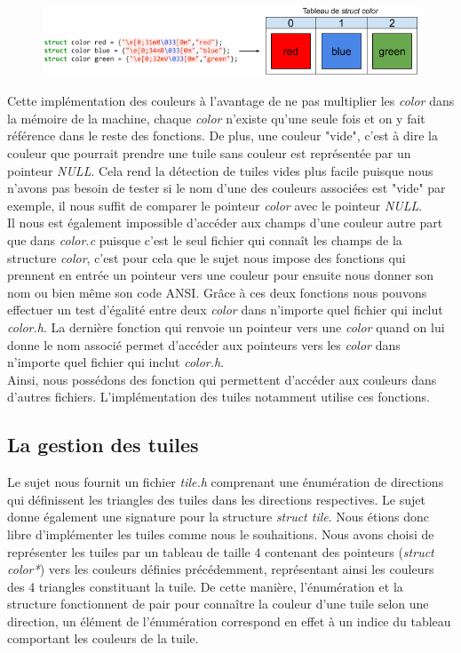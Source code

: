 \documentclass[11pt]{article}
\begin{document}
\begin{figure}[H]
\centering
\includegraphics[scale=0.7]{Couleurs.png}
\label{fig : color}
\end{figure}

Cette implémentation des couleurs à l'avantage de ne pas multiplier les \emph{color} dans la mémoire de la machine, chaque \emph{color} n'existe qu'une seule fois et on y fait référence dans le reste des fonctions. De plus, une couleur "vide", c'est à dire la couleur que pourrait prendre une tuile sans couleur est représentée par un pointeur \emph{NULL}. Cela rend la détection de tuiles vides plus facile puisque nous n'avons pas besoin de tester si le nom d'une des couleurs associées est "vide" par exemple, il nous suffit de comparer le pointeur \emph{color} avec le pointeur \emph{NULL}. \\  

Il nous est également impossible d'accéder aux champs d'une couleur autre part que dans \emph{color.c} puisque c'est le seul fichier qui connaît les champs de la structure \emph{color}, c'est pour cela que le sujet nous impose des fonctions qui prennent en entrée un pointeur vers une couleur pour ensuite nous donner son nom ou bien même son code ANSI. Grâce à ces deux fonctions nous pouvons effectuer un test d'égalité entre deux \emph{color} dans n'importe quel fichier qui inclut \emph{color.h}. La dernière fonction qui renvoie un pointeur vers une \emph{color} quand on lui donne le nom associé permet d'accéder aux pointeurs vers les \emph{color} dans n'importe quel fichier qui inclut \emph{color.h}. \\

Ainsi, nous possédons des fonction qui permettent d'accéder aux couleurs dans d'autres fichiers. L'implémentation des tuiles notamment utilise ces fonctions.

\subsection{La gestion des tuiles}
Le sujet nous fournit un fichier \emph{tile.h} comprenant une énumération de directions qui définissent les triangles des tuiles dans les directions respectives. Le sujet donne également une signature pour la structure \emph{struct tile}. Nous étions donc libre d'implémenter les tuiles comme nous le souhaitions. Nous avons choisi de représenter les tuiles par un tableau de taille 4 contenant des pointeurs (\emph{struct color*}) vers les couleurs définies précédemment, représentant ainsi les couleurs des 4 triangles constituant la tuile. De cette manière, l'énumération et la structure fonctionnent de pair pour connaître la couleur d'une tuile selon une direction, un élément de l'énumération correspond en effet à un indice du tableau comportant les couleurs de la tuile. \\
\end{document}
